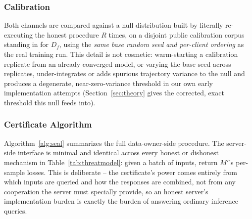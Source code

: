 \documentclass[10pt,journal,compsoc]{IEEEtran}
\begin{document}
\subsubsection{Calibration}

Both channels are compared against a null distribution built by literally re-executing the honest procedure $R$ times, on a disjoint public calibration corpus standing in for $D_f$, using the \emph{same base random seed and per-client ordering} as the real training run. This detail is not cosmetic: warm-starting a calibration replicate from an already-converged model, or varying the base seed across replicates, under-integrates or adds spurious trajectory variance to the null and produces a degenerate, near-zero-variance threshold in our own early implementation attempts (Section~\ref{sec:theory} gives the corrected, exact threshold this null feeds into).

\subsubsection{Certificate Algorithm}

Algorithm~\ref{alg:seal} summarizes the full data-owner-side procedure. The server-side interface is minimal and identical across every honest or dishonest mechanism in Table~\ref{tab:threatmodel}: given a batch of inputs, return $M'$'s per-sample losses. This is deliberate -- the certificate's power comes entirely from which inputs are queried and how the responses are combined, not from any cooperation the server must specially provide, so an honest server's implementation burden is exactly the burden of answering ordinary inference queries.
\end{document}

